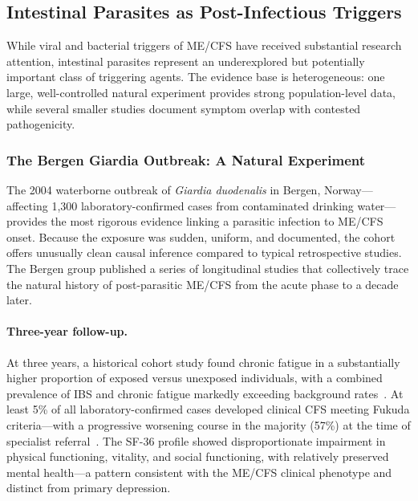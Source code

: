 \subsection{Intestinal Parasites as Post-Infectious Triggers}
\label{sec:parasites-post-infectious}

While viral and bacterial triggers of ME/CFS have received substantial research attention, intestinal parasites represent an underexplored but potentially important class of triggering agents. The evidence base is heterogeneous: one large, well-controlled natural experiment provides strong population-level data, while several smaller studies document symptom overlap with contested pathogenicity.

\subsubsection{The Bergen Giardia Outbreak: A Natural Experiment}

The 2004 waterborne outbreak of \emph{Giardia duodenalis} in Bergen, Norway---affecting 1,300 laboratory-confirmed cases from contaminated drinking water---provides the most rigorous evidence linking a parasitic infection to ME/CFS onset. Because the exposure was sudden, uniform, and documented, the cohort offers unusually clean causal inference compared to typical retrospective studies. The Bergen group published a series of longitudinal studies that collectively trace the natural history of post-parasitic ME/CFS from the acute phase to a decade later.

\paragraph{Three-year follow-up.}
At three years, a historical cohort study found chronic fatigue in a substantially higher proportion of exposed versus unexposed individuals, with a combined prevalence of IBS and chronic fatigue markedly exceeding background rates~\cite{Wensaas2012giardia5yr}. At least 5\% of all laboratory-confirmed cases developed clinical CFS meeting Fukuda criteria---with a progressive worsening course in the majority (57\%) at the time of specialist referral~\cite{Naess2012giardia_cfs}. The SF-36 profile showed disproportionate impairment in physical functioning, vitality, and social functioning, with relatively preserved mental health---a pattern consistent with the ME/CFS clinical phenotype and distinct from primary depression.

